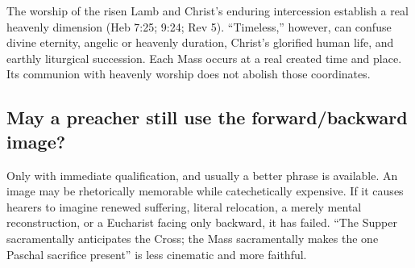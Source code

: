 The worship of the risen Lamb and Christ's enduring intercession establish a
real heavenly dimension (Heb 7:25; 9:24; Rev 5). ``Timeless,'' however, can
confuse divine eternity, angelic or heavenly duration, Christ's glorified human
life, and earthly liturgical succession. Each Mass occurs at a real created
time and place. Its communion with heavenly worship does not abolish those
coordinates.

\subsection*{May a preacher still use the forward/backward image?}

Only with immediate qualification, and usually a better phrase is available.
An image may be rhetorically memorable while catechetically expensive. If it
causes hearers to imagine renewed suffering, literal relocation, a merely
mental reconstruction, or a Eucharist facing only backward, it has failed.
``The Supper sacramentally anticipates the Cross; the Mass sacramentally makes
the one Paschal sacrifice present'' is less cinematic and more faithful.


